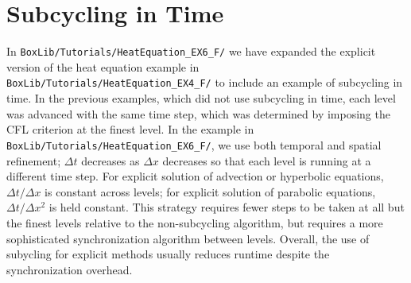 \section{Subcycling in Time}\label{Sec:Subcycling}
In {\tt BoxLib/Tutorials/HeatEquation\_EX6\_F/} we have expanded the
explicit version of the heat equation example in {\tt
  BoxLib/Tutorials/HeatEquation\_EX4\_F/} to include an example of
subcycling in time.  In the previous examples, which did not use
subcycling in time, each level was advanced with the same time step,
which was determined by imposing the CFL criterion at the finest
level.  In the example in {\tt BoxLib/Tutorials/HeatEquation\_EX6\_F/}, 
we use both temporal and spatial refinement; 
$\Delta t$ decreases as $\Delta x$ decreases so
that each level is running at a different time step.  For explicit
solution of advection or hyperbolic equations, $\Delta t / \Delta x$
is constant across levels; for explicit solution of parabolic equations, 
$\Delta t / \Delta x^2$ is held constant.  This strategy
requires fewer steps to be taken at all but the finest levels relative
to the non-subcycling algorithm, but requires a more sophisticated
synchronization algorithm between levels.  Overall, the use of
subycling for explicit methods usually reduces runtime despite the
synchronization overhead.

